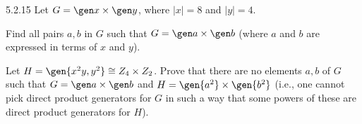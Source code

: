 \begin{spex}{5.2.15}
    Let $G = \gen x \times \gen y$, where $|x| = 8$ and $|y| = 4$.
    \begin{subexercises}
        \item Find all pairs $a, b$ in $G$ such that $G = \gen a \times \gen b$ (where $a$ and $b$ are expressed in terms of $x$ and $y$).
        \item Let $H = \gen{x^2y, y^2} \cong Z_4 \times Z_2$.
	    Prove that there are no elements $a, b$ of $G$ such that $G = \gen a \times \gen b$ and $H = \gen{a^2} \times \gen{b^2}$ (i.e., one cannot pick direct product generators for $G$ in such a way that some powers of these are direct product generators for $H$).
    \end{subexercises}
\end{spex}

